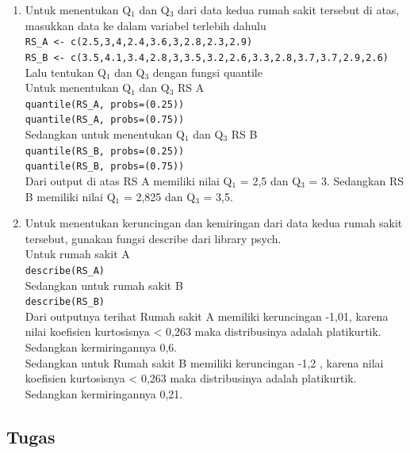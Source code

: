 \documentclass[a4paper,12pt]{article}
\begin{document}
\begin{enumerate}[label=\alph*.]
	\item Untuk menentukan Q$_{1}$ dan Q$_{3}$ dari data kedua rumah sakit tersebut di atas, masukkan data ke dalam variabel terlebih dahulu\\
	\texttt{RS\_A <- c(2.5,3,4,2.4,3.6,3,2.8,2.3,2.9)}\\
	\texttt{RS\_B <- c(3.5,4.1,3.4,2.8,3,3.5,3.2,2.6,3.3,2.8,3.7,3.7,2.9,2.6)}\\
	Lalu tentukan Q$_{1}$ dan Q$_{3}$ dengan fungsi quantile\\
	Untuk menentukan Q$_{1}$ dan Q$_{3}$ RS A\\
	\texttt{quantile(RS\_A, probs=(0.25))}\\
	\texttt{quantile(RS\_A, probs=(0.75))}\\
	Sedangkan untuk menentukan Q$_{1}$ dan Q$_{3}$ RS B\\
	\texttt{quantile(RS\_B, probs=(0.25))}\\
	\texttt{quantile(RS\_B, probs=(0.75))}\\
	Dari output di atas RS A memiliki nilai Q$_{1}$ = 2,5 dan Q$_{3}$ = 3. Sedangkan RS B memiliki nilai Q$_{1}$ = 2,825 dan Q$_{3}$ = 3,5.
	
	\item Untuk menentukan keruncingan dan kemiringan dari data kedua rumah sakit tersebut, gunakan fungsi describe dari library psych.\\
	Untuk rumah sakit A\\
	\texttt{describe(RS\_A)}\\
	Sedangkan untuk rumah sakit B\\ 
	\texttt{describe(RS\_B)}\\
	Dari outputnya terihat Rumah sakit A memiliki keruncingan -1,01, karena nilai koefisien kurtosisnya < 0,263 maka distribusinya adalah platikurtik. Sedangkan kermiringannya 0,6.\\
	Sedangkan untuk Rumah sakit B memiliki keruncingan -1,2 , karena nilai koefisien kurtosisnya < 0,263 maka distribusinya adalah platikurtik. Sedangkan kermiringannya 0,21.
\end{enumerate}

\subsection{Tugas}
\end{document}

